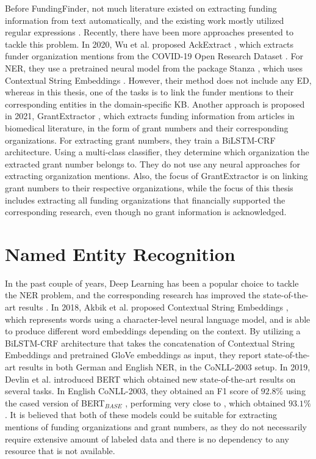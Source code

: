 \documentclass{report}
\theoremstyle{definition}
\theoremstyle{remark}
\begin{document}
    Before FundingFinder, not much literature existed on extracting funding information from text automatically, and the existing work mostly utilized regular expressions \cite{ElsPaper}. Recently, there have been more approaches presented to tackle this problem. In 2020, Wu et al. proposed AckExtract  \cite{AckExtract}, which extracts funder organization mentions from the COVID-19 Open Research Dataset \cite{CORD}. For NER, they use a pretrained neural model from the package Stanza \cite{stanza}, which uses Contextual String Embeddings \cite{flairpaper}. However, their method does not include any ED, whereas in this thesis, one of the tasks is to link the funder mentions to their corresponding entities in the domain-specific KB. Another approach is proposed in 2021, GrantExtractor \cite{GrantExtractor}, which extracts funding information from articles in biomedical literature, in the form of grant numbers and their corresponding organizations. For extracting grant numbers, they train a BiLSTM-CRF \cite{BiLSTMCRF} architecture. Using a multi-class classifier, they determine which organization the extracted grant number belongs to. They do not use any neural approaches for extracting organization mentions. Also, the focus of GrantExtractor is on linking grant numbers to their respective organizations, while the focus of this thesis includes extracting all funding organizations that financially supported the corresponding research, even though no grant information is acknowledged.

\section{Named Entity Recognition}
\label{sota1}
In the past couple of years, Deep Learning has been a popular choice to tackle the NER problem, and the corresponding research has improved the state-of-the-art results \cite{NERsurvey}. In 2018, Akbik et al. proposed Contextual String Embeddings \cite{flairpaper}, which represents words using a character-level neural language model, and is able to produce different word embeddings depending on the context. By utilizing a BiLSTM-CRF architecture that takes the concatenation of Contextual String Embeddings and pretrained GloVe embeddings \cite{glove} as input, they report state-of-the-art results in both German and English NER, in the CoNLL-2003 \cite{conll} setup. In 2019, Devlin et al. introduced BERT \cite{BERT} which obtained new state-of-the-art results on several tasks. In English CoNLL-2003, they obtained an F1 score of $92.8\%$ using the cased version of BERT$_{BASE}$ \cite{BERT}, performing very close to \cite{flairpaper}, which obtained $93.1\%$. It is believed that both of these models could be suitable for extracting mentions of funding organizations and grant numbers, as they do not necessarily require extensive amount of labeled data and there is no dependency to any resource that is not available.
\end{document}
